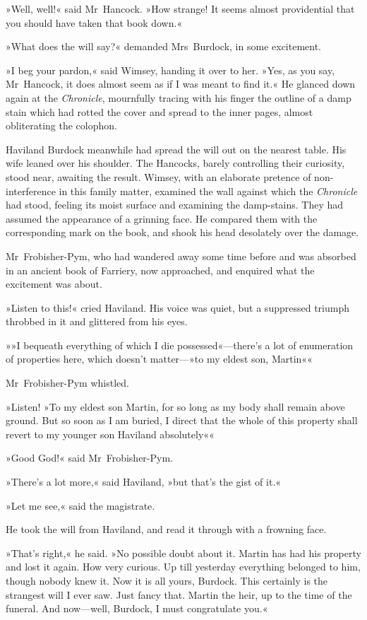 »Well, well!« said Mr~Hancock. »How strange! It seems almost providential that you should have taken that book down.«

»What does the will say?« demanded Mrs~Burdock, in some excitement.

»I beg your pardon,« said Wimsey, handing it over to her. »Yes, as you say, Mr~Hancock, it does almost seem as if I was meant to find it.« He glanced down again at the \textit{Chronicle}, mournfully tracing with his finger the outline of a damp stain which had rotted the cover and spread to the inner pages, almost obliterating the colophon.

Haviland Burdock meanwhile had spread the will out on the nearest table. His wife leaned over his shoulder. The Hancocks, barely controlling their curiosity, stood near, awaiting the result. Wimsey, with an elaborate pretence of non-interference in this family matter, examined the wall against which the \textit{Chronicle} had stood, feeling its moist surface and examining the damp-stains. They had assumed the appearance of a grinning face. He compared them with the corresponding mark on the book, and shook his head desolately over the damage.

Mr~Frobisher-Pym, who had wandered away some time before and was absorbed in an ancient book of Farriery, now approached, and enquired what the excitement was about.

»Listen to this!« cried Haviland. His voice was quiet, but a suppressed triumph throbbed in it and glittered from his eyes.

»»I bequeath everything of which I die possessed«—there's a lot of enumeration of properties here, which doesn't matter—»to my eldest son, Martin«\longdash«

Mr~Frobisher-Pym whistled.

»Listen! »To my eldest son Martin, for so long as my body shall remain above ground. But so soon as I am buried, I direct that the whole of this property shall revert to my younger son Haviland absolutely«\longdash«

»Good God!« said Mr~Frobisher-Pym.

»There's a lot more,« said Haviland, »but that's the gist of it.«

»Let me see,« said the magistrate.

He took the will from Haviland, and read it through with a frowning face.

»That's right,« he said. »No possible doubt about it. Martin has had his property and lost it again. How very curious. Up till yesterday everything belonged to him, though nobody knew it. Now it is all yours, Burdock. This certainly is the strangest will I ever saw. Just fancy that. Martin the heir, up to the time of the funeral. And now—well, Burdock, I must congratulate you.«

